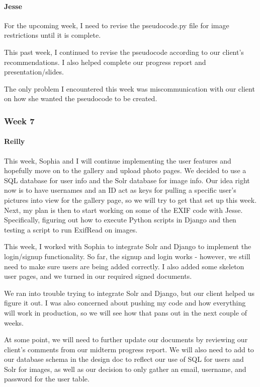 \documentclass[onecolumn, draftclsnofoot,10pt, compsoc]{IEEEtran}
\begin{document}
\begin{flushleft}
\paragraph{Jesse}
 
For the upcoming week, I need to revise the pseudocode.py file for image restrictions until it is complete.
 
 
This past week, I continued to revise the pseudocode according to our client's recommendations. I also helped complete our progress report and presentation/slides.
 
 
The only problem I encountered this week was miscommunication with our client on how she wanted the pseudocode to be created.
 
\subsubsection{Week 7}
\paragraph{Reilly}
 
This week, Sophia and I will continue implementing the user features and hopefully move on to the gallery and upload photo pages. We decided to use a SQL database for user info and the Solr database for image info. Our idea right now is to have usernames and an ID act as keys for pulling a specific user's pictures into view for the gallery page, so we will try to get that set up this week. Next, my plan is then to start working on some of the EXIF code with Jesse. Specifically, figuring out how to execute Python scripts in Django and then testing a script to run ExifRead on images.
 
 
This week, I worked with Sophia to integrate Solr and Django to implement the login/signup functionality. So far, the signup and login works - however, we still need to make sure users are being added correctly. I also added some skeleton user pages, and we turned in our required signed documents.
 
 
We ran into trouble trying to integrate Solr and Django, but our client helped us figure it out. I was also concerned about pushing my code and how everything will work in production, so we will see how that pans out in the next couple of weeks.
 
At some point, we will need to further update our documents by reviewing our client's comments from our midterm progress report. We will also need to add to our database schema in the design doc to reflect our use of SQL for users and Solr for images, as well as our decision to only gather an email, username, and password for the user table.
 

\end{flushleft}
\end{document}
